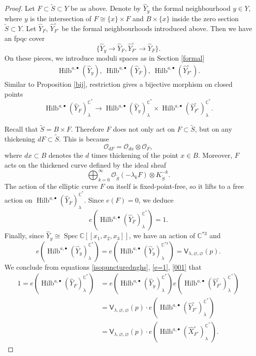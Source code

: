 \documentclass{amsart}
\theoremstyle{definition}
\newcommand{\CC} {\mathbb{C}}          %
\renewcommand{\O}{\mathcal{O}}
\newcommand{\sfV}{\mathsf{V}}
\newcommand{\Hilb}{\operatorname{Hilb}}
\newcommand{\Spec}{\operatorname{Spec}}
\begin{document}
\begin{proof}
Let $F \subset \tilde{S} \subset Y$ be as above. Denote by $\widehat{Y}_{y}$ the formal neighbourhood $y \in Y$, where $y$ is the intersection of $F \cong \{x\} \times F$ and $B \times \{x\}$ inside the zero section $\tilde{S} \subset Y$. Let $\widehat{Y}_F$, $\widehat{Y}^{\circ}_{F^\circ}$ be the formal neighbourhoods introduced above. Then we have an fpqc cover
$$
\{\widehat{Y}_y \rightarrow \widehat{Y}_F, \widehat{Y}^{\circ}_{F^\circ} \rightarrow \widehat{Y}_F\}. 
$$
On these pieces, we introduce moduli spaces as in Section \ref{formal}
\begin{align*}
\Hilb^{a,\bullet}(\widehat{Y}_y), \ \Hilb^{a,\bullet}(\widehat{Y}_F), \ \Hilb^{a,\bullet}(\widehat{Y}^{\circ}_{F^\circ}).
\end{align*}
Similar to Proposition \ref{bij}, restriction gives a bijective morphism on closed points
$$
\Hilb^{a,\bullet}(\widehat{Y}_F)^{\CC^*}_{\lambda} \rightarrow \Hilb^{a,\bullet}(\widehat{Y}_y)^{\CC^*}_{\lambda} \times \Hilb^{a,\bullet}(\widehat{Y}^{\circ}_{F^\circ})^{\CC^*}_{\lambda}.
$$

Recall that $\tilde{S} = B \times F$. Therefore $F$ does not only act on $F \subset \tilde{S}$, but on any thickening $d F \subset \tilde{S}$. This is because
$$
\O_{dF} = \O_{d x} \otimes \O_F,
$$
where $dx \subset B$ denotes the $d$ times thickening of the point $x \in B$. Moreover, $F$ acts on the thickened curve defined by the ideal sheaf
$$
\bigoplus_{k=0}^{\infty} \O_{\tilde{S}}(-\lambda_k F) \otimes K_{\tilde{S}}^{-k}.
$$
The action of the elliptic curve $F$ on itself is fixed-point-free, so it lifts to a free action on $\Hilb^{a,\bullet}(\widehat{Y}_F)^{\CC^*}_{\lambda}$. Since $e(F) = 0$, we deduce
\begin{equation} \label{e=1}
e(\Hilb^{a,\bullet}(\widehat{Y}_F)^{\CC^*}_{\lambda}) = 1.
\end{equation}
Finally, since $\widehat{Y}_y \cong \Spec \CC[\![x_1,x_2,x_3]\!]$, we have an action of $\CC^{*3}$ and 
\begin{equation} \label{001}
e(\Hilb^{a,\bullet}(\widehat{Y}_y)^{\CC^*}_{\lambda}) = e(\Hilb^{a,\bullet}(\widehat{Y}_y)^{\CC^{*3}}_{\lambda}) = \sfV_{\lambda,\varnothing,\varnothing}(p).
\end{equation}
We conclude from equations \eqref{isopuncturednghs}, \eqref{e=1}, \eqref{001} that
\begin{align*}
1=e(\Hilb^{a,\bullet}(\widehat{Y}_F)^{\CC^*}_{\lambda}) &= e( \Hilb^{a,\bullet}(\widehat{Y}_y)^{\CC^*}_{\lambda}) e(\Hilb^{a,\bullet}(\widehat{Y}^{\circ}_{F^\circ})^{\CC^*}_{\lambda}) \\
&=  \sfV_{\lambda,\varnothing,\varnothing}(p) \cdot e(\Hilb^{a,\bullet}(\widehat{Y}^{\circ}_{F^\circ})^{\CC^*}_{\lambda}) \\
&=  \sfV_{\lambda,\varnothing,\varnothing}(p) \cdot e(\Hilb^{a,\bullet}(\widehat{X}^{\circ}_{F^\circ})^{\CC^*}_{\lambda}).
\end{align*}


\end{proof}
\end{document}
